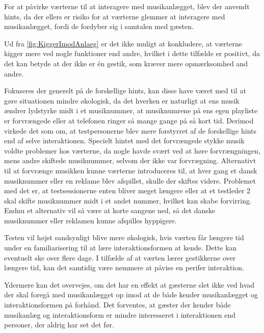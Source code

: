 For at påvirke værterne til at interagere med musikanlægget, blev der anvendt hints, da der ellers er risiko for at værterne glemmer at interagere med musikanlægget, fordi de fordyber sig i samtalen med gæsten. 



 Ud fra \autoref{fig:KiggerImodAnlaeg} er det ikke muligt at konkludere, at værterne kigger mere ved nogle funktioner end andre, hvilket i dette tilfælde er positivt, da det kan betyde at der ikke er én gestik, som kræver mere opmærksomhed and andre. 

Fokuseres der generelt på de forskellige hints, kan disse have været med til at gøre situationen mindre økologisk, da det hverken er naturligt at ens musik ændrer lydstyrke midt i et musiknummer, at musiknumrene på ens egen playliste er forvrængede eller at telefonen ringer så mange gange på så kort tid. Derimod virkede det som om, at testpersonerne blev mere forstyrret af de forskellige hints end af selve interaktionen. Specielt hintet med det forvrængede stykke musik voldte problemer hos værterne, da nogle havde svært ved at høre forvrængningen, mens andre skiftede musiknummer, selvom der ikke var forvrægning. Alternativt til at forvrænge musikken kunne værterne introduceres til, at hver gang et dansk musiknummer eller en reklame blev afspillet, skulle der skiftes videre. Problemet med det er, at testsessionerne enten bliver meget længere eller at et testleder 2 skal skifte musiknummer midt i et andet nummer, hvilket kan skabe forvirring. Endnu et alternativ vil så være at korte sangene ned, så det danske musiknummer eller reklamen kunne afspilles hyppigere. 

Testen vil højst sandsynligt blive mere økologisk, hvis værten får længere tid under en familiarisering til at lære interaktionsformen at kende. Dette kan eventuelt ske over flere dage. I tilfælde af at værten lærer gestikkerne over længere tid, kan det samtidig være nemmere at påvise en perifer interaktion.

 Ydermere kan det overvejes, om det har en effekt at gæsterne slet ikke ved hvad der skal foregå med musikanlægget op imod at de både kender musikanlægget og interaktionsformen på forhånd. Det forventes, at gæster der kender både musikanlæg og interaktionsform er mindre interesseret i interaktionen end personer, der aldrig har set det før. \blankline
 